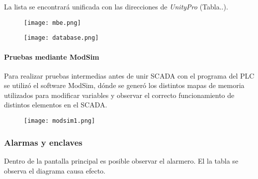 La lista se encontrará unificada con las direcciones de \textit{UnityPro} (Tabla..).

\begin{figure}[h]
	\centering
	\texttt{[image: mbe.png]}
	\label{fig:mbe}
\end{figure}
\begin{figure}[h]
	\centering
	\texttt{[image: database.png]}
	\label{fig:database}
\end{figure}


\paragraph{Pruebas mediante ModSim}
Para realizar pruebas intermedias antes de unir SCADA con el programa del PLC se utilizó el software ModSim, dónde se generó los distintos mapas de memoria utilizados para modificar variables y observar el correcto funcionamiento de distintos elementos en el SCADA.

\begin{figure}[htb]
	\centering
	\texttt{[image: modsim1.png]}
	\label{fig:modsim1}
\end{figure}



\subsubsection{Alarmas y enclaves}
Dentro de la pantalla principal es posible observar el alarmero. El la tabla 
 se observa el diagrama causa efecto.

